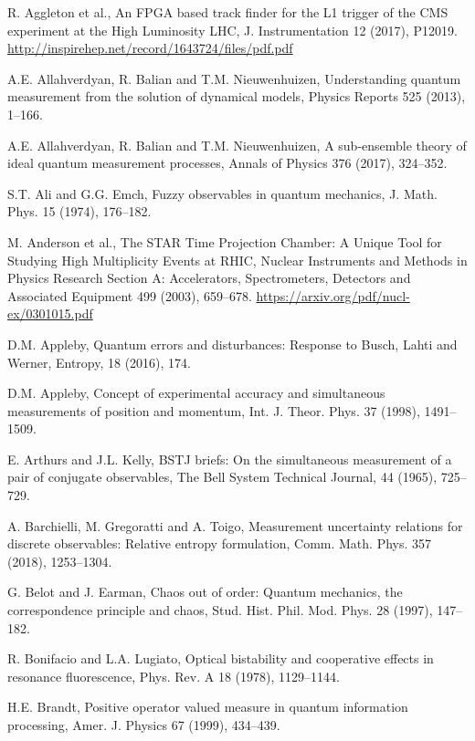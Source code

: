\documentclass[12pt]{article}
\begin{document}
\begin{thebibliography}{99}

 R. Aggleton et al.,
An FPGA based track finder for the L1 trigger of the CMS
experiment at the High Luminosity LHC,
J. Instrumentation 12 (2017), P12019.
\url{http://inspirehep.net/record/1643724/files/pdf.pdf}

 A.E. Allahverdyan, R. Balian and T.M. Nieuwenhuizen,
Understanding quantum measurement from the solution of dynamical models,
Physics Reports 525 (2013), 1--166.

 A.E. Allahverdyan, R. Balian and T.M. Nieuwenhuizen,
A sub-ensemble theory of ideal quantum measurement processes,
Annals of Physics 376 (2017), 324--352.

 S.T. Ali and G.G. Emch,
Fuzzy observables in quantum mechanics,
J. Math. Phys. 15 (1974), 176--182.

 M. Anderson et al.,
The STAR Time Projection Chamber: A Unique Tool
for Studying High Multiplicity Events at RHIC,
Nuclear Instruments and Methods in Physics Research Section A:
Accelerators, Spectrometers, Detectors and Associated Equipment
499 (2003), 659--678.
\url{https://arxiv.org/pdf/nucl-ex/0301015.pdf}

 D.M. Appleby,
Quantum errors and disturbances: Response to Busch, Lahti and Werner,
Entropy, 18 (2016), 174.

 D.M. Appleby,
Concept of experimental accuracy and simultaneous measurements of
position and momentum, Int. J. Theor. Phys. 37 (1998), 1491--1509.

 E. Arthurs and J.L. Kelly,
BSTJ briefs: On the simultaneous measurement of a pair of conjugate
observables,
The Bell System Technical Journal, 44 (1965), 725--729.

 A. Barchielli, M. Gregoratti and A. Toigo,
Measurement uncertainty relations for discrete observables: Relative
entropy formulation,
Comm. Math. Phys. 357 (2018), 1253--1304.

 G. Belot and J. Earman, 
Chaos out of order: Quantum mechanics, the correspondence principle and 
chaos,
Stud. Hist. Phil. Mod. Phys. 28 (1997), 147--182.

 R. Bonifacio and L.A. Lugiato,
Optical bistability and cooperative effects in resonance fluorescence,
Phys. Rev. A 18 (1978), 1129--1144.

 H.E. Brandt,
Positive operator valued measure in quantum information processing,
Amer. J. Physics 67 (1999), 434--439.


\end{thebibliography}
\end{document}
